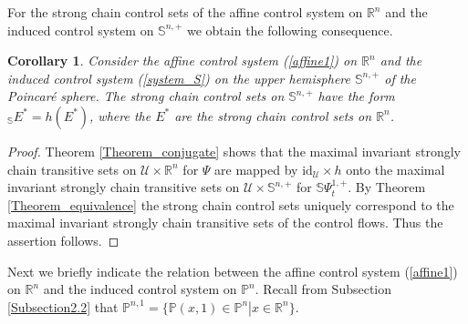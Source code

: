 \documentclass[preprint,12pt]{elsarticle}
\newtheorem{corollary}{Corollary}
\begin{document}
For the strong chain control sets of the affine control system on
$\mathbb{R}^{n}$ and the induced control system on $\mathbb{S}^{n,+}$ we
obtain the following consequence.

\begin{corollary}
\label{Corollary_relation}Consider the affine control system (\ref{affine1})
on $\mathbb{R}^{n}$ and the induced control system (\ref{system_S}) on the
upper hemisphere $\mathbb{S}^{n,+}$ of the Poincar\'{e} sphere. The strong
chain control sets on $\mathbb{S}^{n,+}$ have the form $_{\mathbb{S}}E^{\ast
}=h(E^{\ast})$, where the $E^{\ast}$ are the strong chain control sets on
$\mathbb{R}^{n}$.
\end{corollary}

\begin{proof}
Theorem \ref{Theorem_conjugate} shows that the maximal invariant strongly
chain transitive sets on $\mathcal{U}\times\mathbb{R}^{n}$ for $\Psi$ are
mapped by $\mathrm{id}_{\mathcal{U}}\times h$ onto the maximal invariant
strongly chain transitive sets on $\mathcal{U}\times\mathbb{S}^{n,+}$ for
$\mathbb{S}\Psi_{t}^{1,+}$. By Theorem \ref{Theorem_equivalence} the strong
chain control sets uniquely correspond to the maximal invariant strongly chain
transitive sets of the control flows. Thus the assertion follows.
\end{proof}

Next we briefly indicate the relation between the affine control system
(\ref{affine1}) on $\mathbb{R}^{n}$ and the induced control system on
$\mathbb{P}^{n}$. Recall from Subsection \ref{Subsection2.2} that
$\mathbb{P}^{n,1}=\{\mathbb{P}(x,1)\in\mathbb{P}^{n}\left\vert x\in
\mathbb{R}^{n}\right.  \}$.
\end{document}
